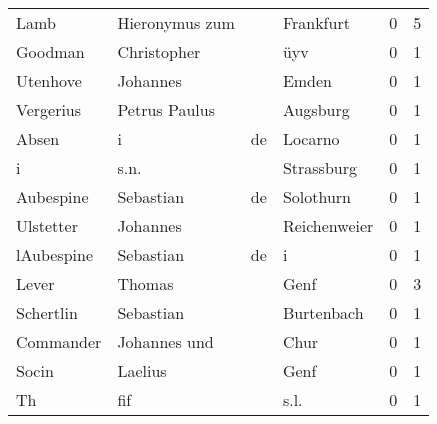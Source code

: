 \begin{tabular}{llllrr}
                     Lamb &                     Hieronymus zum &             &                                   Frankfurt &          0 &         5 \\
                  Goodman &                        Christopher &             &                                         üyv &          0 &         1 \\
                 Utenhove &                           Johannes &             &                                       Emden &          0 &         1 \\
                Vergerius &                      Petrus Paulus &             &                                    Augsburg &          0 &         1 \\
                    Absen &                                  i &          de &                                     Locarno &          0 &         1 \\
                        i &                               s.n. &             &                                  Strassburg &          0 &         1 \\
                Aubespine &                          Sebastian &          de &                                   Solothurn &          0 &         1 \\
                Ulstetter &                           Johannes &             &                                Reichenweier &          0 &         1 \\
               lAubespine &                          Sebastian &          de &                                           i &          0 &         1 \\
                    Lever &                             Thomas &             &                                        Genf &          0 &         3 \\
                Schertlin &                          Sebastian &             &                                  Burtenbach &          0 &         1 \\
                Commander &                       Johannes und &             &                                        Chur &          0 &         1 \\
                    Socin &                            Laelius &             &                                        Genf &          0 &         1 \\
                       Th &                                fif &             &                                        s.l. &          0 &         1 \\

\end{tabular}
